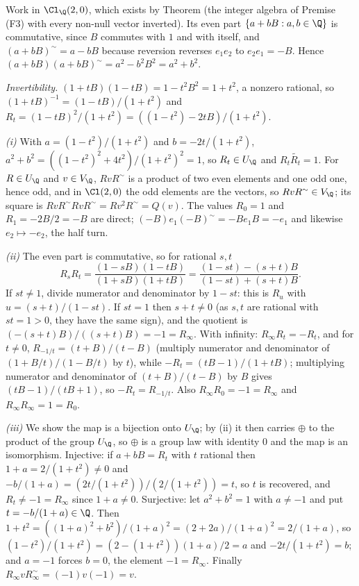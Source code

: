 Work in $\Cl_{\Q}(2,0)$, which exists by Theorem  (the integer algebra of Premise (F3) with every non-null vector inverted). Its even part $\{a + bB : a, b \in \Q\}$ is commutative, since $B$ commutes with $1$ and with itself, and $(a + bB)^{\sim} = a - bB$ because reversion reverses $e_{1}e_{2}$ to $e_{2}e_{1} = -B$. Hence $(a + bB)(a + bB)^{\sim} = a^{2} - b^{2}B^{2} = a^{2} + b^{2}$.

\emph{Invertibility.} $(1 + tB)(1 - tB) = 1 - t^{2}B^{2} = 1 + t^{2}$, a nonzero rational, so $(1 + tB)^{-1} = (1 - tB)/(1 + t^{2})$ and $R_{t} = (1 - tB)^{2}/(1 + t^{2}) = ((1 - t^{2}) - 2tB)/(1 + t^{2})$.

\emph{(i)} With $a = (1 - t^{2})/(1 + t^{2})$ and $b = -2t/(1 + t^{2})$, $a^{2} + b^{2} = ((1 - t^{2})^{2} + 4t^{2})/(1 + t^{2})^{2} = 1$, so $R_{t} \in U_{\Q}$ and $R_{t}\widetilde{R_{t}} = 1$. For $R \in U_{\Q}$ and $v \in V_{\Q}$, $RvR^{\sim}$ is a product of two even elements and one odd one, hence odd, and in $\Cl(2,0)$ the odd elements are the vectors, so $RvR^{\sim} \in V_{\Q}$; its square is $RvR^{\sim}RvR^{\sim} = Rv^{2}R^{\sim} = Q(v)$. The values $R_{0} = 1$ and $R_{1} = -2B/2 = -B$ are direct; $(-B)e_{1}(-B)^{\sim} = -Be_{1}B = -e_{1}$ and likewise $e_{2} \mapsto -e_{2}$, the half turn.

\emph{(ii)} The even part is commutative, so for rational $s, t$
\[
R_{s}R_{t} = \frac{(1 - sB)(1 - tB)}{(1 + sB)(1 + tB)} = \frac{(1 - st) - (s + t)B}{(1 - st) + (s + t)B}.
\]
If $st \ne 1$, divide numerator and denominator by $1 - st$: this is $R_{u}$ with $u = (s + t)/(1 - st)$. If $st = 1$ then $s + t \ne 0$ (as $s, t$ are rational with $st = 1 > 0$, they have the same sign), and the quotient is $(-(s + t)B)/((s + t)B) = -1 = R_{\infty}$. With infinity: $R_{\infty}R_{t} = -R_{t}$, and for $t \ne 0$, $R_{-1/t} = (t + B)/(t - B)$ (multiply numerator and denominator of $(1 + B/t)/(1 - B/t)$ by $t$), while $-R_{t} = (tB - 1)/(1 + tB)$; multiplying numerator and denominator of $(t + B)/(t - B)$ by $B$ gives $(tB - 1)/(tB + 1)$, so $-R_{t} = R_{-1/t}$. Also $R_{\infty}R_{0} = -1 = R_{\infty}$ and $R_{\infty}R_{\infty} = 1 = R_{0}$.

\emph{(iii)} We show the map is a bijection onto $U_{\Q}$; by (ii) it then carries $\oplus$ to the product of the group $U_{\Q}$, so $\oplus$ is a group law with identity $0$ and the map is an isomorphism. Injective: if $a + bB = R_{t}$ with $t$ rational then $1 + a = 2/(1 + t^{2}) \ne 0$ and $-b/(1 + a) = (2t/(1 + t^{2}))/(2/(1 + t^{2})) = t$, so $t$ is recovered, and $R_{t} \ne -1 = R_{\infty}$ since $1 + a \ne 0$. Surjective: let $a^{2} + b^{2} = 1$ with $a \ne -1$ and put $t = -b/(1 + a) \in \Q$. Then $1 + t^{2} = ((1 + a)^{2} + b^{2})/(1 + a)^{2} = (2 + 2a)/(1 + a)^{2} = 2/(1 + a)$, so $(1 - t^{2})/(1 + t^{2}) = (2 - (1 + t^{2}))(1 + a)/2 = a$ and $-2t/(1 + t^{2}) = b$; and $a = -1$ forces $b = 0$, the element $-1 = R_{\infty}$. Finally $R_{\infty}vR_{\infty}^{\sim} = (-1)v(-1) = v$.

